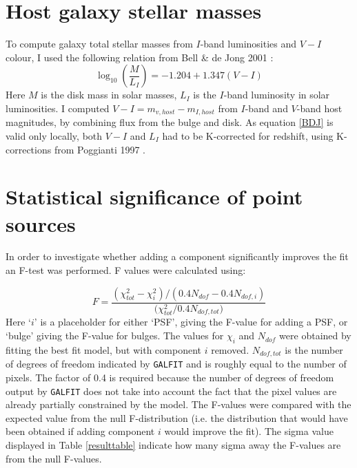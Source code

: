 \documentclass[11pt,twocolumn]{article}
\begin{document}
\section{Host galaxy stellar masses}\label{diskmass}
To compute galaxy total stellar masses from $I$-band luminosities and $V-I$ colour, I used the following relation from Bell \& de Jong 2001\cite{2001ApJ...550..212B} :
\begin{equation}
\log_{10}{\left( \frac{M}{L_{I}} \right)} = -1.204 + 1.347 (V - I)
\label{BDJ}
\end{equation}
Here $M$ is the disk mass in solar masses, $L_{I}$  is the $I$-band luminosity in solar luminosities. I computed  $V-I=m_{v,host}-m_{I,host}$ from $I$-band and $V$-band host magnitudes, by combining flux from the bulge and disk. As equation \ref{BDJ} is valid only locally, both $V-I$ and $L_{I}$ had to be K-corrected for redshift, using K-corrections from Poggianti 1997 \cite{1997AAS..122..399P}. 

\section{Statistical significance of point sources}\label{ftest}
In order to investigate whether adding a component significantly improves the fit an F-test was performed. F values were calculated using: 

\begin{equation}
F =  \frac{(\chi^{2}_{tot} - \chi^{2}_{i})/(0.4 N_{dof}-0.4 N_{dof,i})}{(\chi^2_{tot}/{0.4 N_{dof,tot})}}
\end{equation}
Here `$i$' is a placeholder for either `PSF', giving the F-value for adding a PSF, or `bulge' giving the F-value for bulges. The values for $\chi_{i}$ and $N_{dof}$ were obtained by fitting the best fit model, but with component $i$ removed.  $N_{dof,tot}$ is the number of degrees of freedom indicated by {\tt GALFIT} and is roughly equal to the number of pixels. The factor of 0.4 is required because the number of degrees of freedom output by {\tt GALFIT} does not take into account the fact that the pixel values are already partially constrained by the model.  The F-values were compared with the expected value from the null F-distribution (i.e. the distribution that would have been obtained if adding component $i$ would improve the fit). The sigma value displayed in Table \ref{resulttable} indicate how many sigma away the F-values are from the null F-values. 

\end{document}
